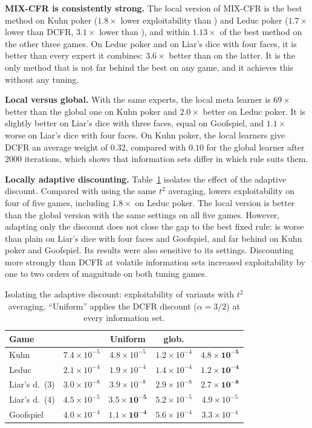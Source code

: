 \textbf{MIX-CFR is consistently strong.} The local version of MIX-CFR is the best method on Kuhn
poker ($1.8\times$ lower exploitability than \pcfrp{}) and Leduc poker ($1.7\times$ lower than
DCFR, $3.1\times$ lower than \cfrp{}), and within $1.13\times$ of the best method on the other
three games. On Leduc poker and on Liar's dice with four faces, it is better than every
expert it combines: $3.6\times$ better than \pcfrp{} on the latter. It is the only method that is
not far behind the best on any game, and it achieves this without any tuning.

\textbf{Local versus global.} With the same experts, the local meta learner is $69\times$ better
than the global one on Kuhn poker and $2.0\times$ better on Leduc poker. It is slightly better on
Liar's dice with three faces, equal on Goofspiel, and $1.1\times$ worse on Liar's dice with four
faces. On Kuhn poker, the local learners give DCFR an average weight of $0.32$, compared with
$0.10$ for the global learner after 2000 iterations, which shows that information sets differ in which rule
suits them.

\textbf{Locally adaptive discounting.} Table~\ref{tab:lad} isolates the effect of the adaptive
discount. Compared with \cfrp{} using the same $t^2$ averaging, \ours{} lowers exploitability on
four of five games, including $1.8\times$ on Leduc poker. The local version is better than the
global version with the same settings on all five games. However, adapting only the discount
does not close the gap to the best fixed rule: \ours{} is worse than plain \cfrp{} on Liar's
dice with four faces and Goofspiel, and far behind \pcfrp{} on Kuhn poker and Goofspiel. Its
results were also sensitive to its settings. Discounting more strongly than DCFR at volatile
information sets increased exploitability by one to two orders of magnitude on both tuning
games.

\begin{table}[t]
\centering
\caption{Isolating the adaptive discount: exploitability of \cfrp{} variants with
$t^2$ averaging. ``Uniform'' applies the DCFR discount ($\alpha=3/2$) at every information set.}
\label{tab:lad}
\setlength{\tabcolsep}{3pt}
\begin{tabular}{@{}lcccc@{}}
\toprule
\textbf{Game} & \textbf{\cfrp{}} & \textbf{Uniform} & \textbf{\ours{} glob.} & \textbf{\ours{}} \\
\midrule
Kuhn         & $7.4\times10^{-5}$ & $4.8\times10^{-5}$ & $1.2\times10^{-4}$ & $\mathbf{4.8\times10^{-5}}$ \\
Leduc        & $2.1\times10^{-4}$ & $1.9\times10^{-4}$ & $1.4\times10^{-4}$ & $\mathbf{1.2\times10^{-4}}$ \\
Liar's d.\ (3) & $3.0\times10^{-8}$ & $3.9\times10^{-8}$ & $2.9\times10^{-8}$ & $\mathbf{2.7\times10^{-8}}$ \\
Liar's d.\ (4) & $4.5\times10^{-5}$ & $\mathbf{3.5\times10^{-5}}$ & $5.2\times10^{-5}$ & $4.9\times10^{-5}$ \\
Goofspiel    & $4.0\times10^{-4}$ & $\mathbf{1.1\times10^{-4}}$ & $5.6\times10^{-4}$ & $3.3\times10^{-4}$ \\
\bottomrule
\end{tabular}
\end{table}

